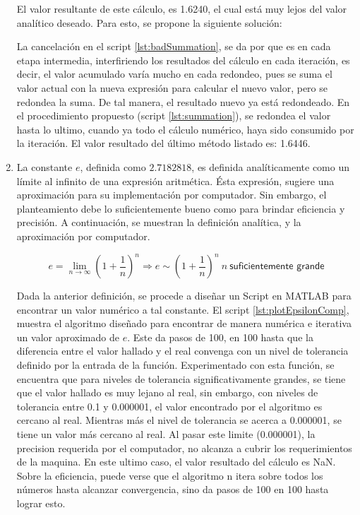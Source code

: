 \documentclass[11pt, spanish]{article}
\begin{document}
\begin{enumerate}
El valor resultante de este cálculo, es 1.6240, el cual está muy lejos del valor analítico deseado. Para esto, se propone la siguiente solución:



La cancelación en el script \ref{lst:badSummation}, se da por que es en cada etapa intermedia, interfiriendo los resultados del cálculo en cada iteración, es decir, el valor acumulado varía mucho en cada redondeo, pues se suma el valor actual con la nueva expresión para calcular el nuevo valor, pero se redondea la suma. De tal manera, el resultado nuevo ya está redondeado. En el procedimiento propuesto (script \ref{lst:summation}), se redondea el valor hasta lo ultimo, cuando ya todo el cálculo numérico, haya sido consumido por la iteración. El valor resultado del último método listado es: 1.6446.

\item La constante $e$, definida como $2.7182818$, es definida analíticamente como un límite al infinito de una expresión aritmética. Ésta expresión, sugiere una aproximación para su implementación por computador. Sin embargo, el planteamiento debe lo suficientemente bueno como para brindar eficiencia y precisión.  A continuación, se muestran la definición analítica, y la aproximación por computador.

$$e = \lim_{n\to\infty} \left( 1 + \frac{1}{n}\right)^n \Rightarrow e \sim \left( 1 + \frac{1}{n}\right)^n\ n\ \textsf{suficientemente grande}$$

Dada la anterior definición, se procede a diseñar un Script en \textsc{MATLAB} para encontrar un valor numérico a tal constante. El script \ref{lst:plotEpsilonComp}, muestra el algoritmo diseñado para encontrar de manera numérica e iterativa un valor aproximado de $e$. Este da pasos de 100, en 100 hasta que la diferencia entre el valor hallado y el real convenga con un nivel de tolerancia definido por la entrada de la función. Experimentado con esta función, se encuentra que para niveles de tolerancia significativamente grandes, se tiene que el valor hallado es muy lejano al real, sin embargo, con niveles de tolerancia entre 0.1 y 0.000001, el valor encontrado por el algoritmo es cercano al real. Mientras más el nivel de tolerancia se acerca a 0.000001, se tiene un valor más cercano al real. Al pasar este limite (0.000001), la precision requerida por el computador, no alcanza a cubrir los requerimientos de la maquina. En este ultimo caso, el valor resultado del cálculo es NaN. Sobre la eficiencia, puede verse que el algoritmo n itera sobre todos los números hasta alcanzar convergencia, sino da pasos de 100 en 100 hasta lograr esto.

\end{enumerate}
\end{document}
